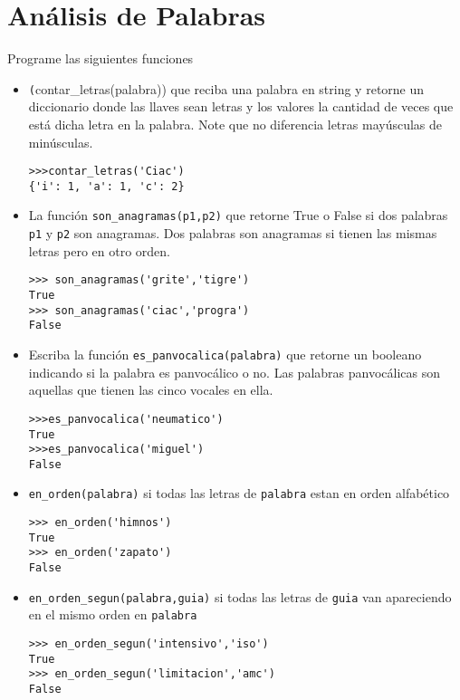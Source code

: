 \section{Análisis de Palabras}

Programe las siguientes funciones
\begin{itemize}

    \item \texttt(contar\_letras(palabra)) que reciba una palabra en string y retorne un diccionario donde las llaves sean letras y los valores la cantidad de veces que está dicha letra en la palabra. Note que no diferencia letras mayúsculas de minúsculas.
    
    \begin{lstlisting}[style=consola]
>>>contar_letras('Ciac')
{'i': 1, 'a': 1, 'c': 2}
    \end{lstlisting}
    
    \item La función \texttt{son\_anagramas(p1,p2)} que retorne True o False si dos palabras \texttt{p1} y \texttt{p2} son anagramas. Dos palabras son anagramas si tienen las mismas letras pero en otro orden. 
    
    \begin{lstlisting}[style=consola]
>>> son_anagramas('grite','tigre')
True
>>> son_anagramas('ciac','progra')
False
    \end{lstlisting}
    
    \item Escriba la función \texttt{es\_panvocalica(palabra)} que retorne un booleano indicando si la palabra es panvocálico o no. Las palabras panvocálicas son aquellas que tienen las cinco vocales en ella.
    
    \begin{lstlisting}[style=consola]
>>>es_panvocalica('neumatico')
True
>>>es_panvocalica('miguel')
False
    \end{lstlisting}
    
    \item \texttt{en\_orden(palabra)} si todas las letras de \texttt{palabra} estan en orden alfabético
    \begin{lstlisting}[style=consola]
>>> en_orden('himnos')
True
>>> en_orden('zapato')
False
    \end{lstlisting}
    
    \item \texttt{en\_orden\_segun(palabra,guia)} si todas las letras de \texttt{guia} van apareciendo en el mismo orden en \texttt{palabra}
    \begin{lstlisting}[style=consola]
>>> en_orden_segun('intensivo','iso')
True
>>> en_orden_segun('limitacion','amc')
False
    \end{lstlisting}
    

\end{itemize}
